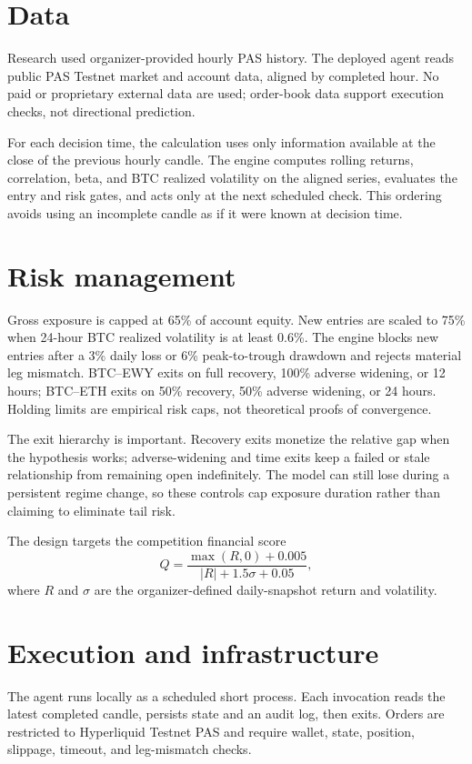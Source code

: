 \documentclass[a4paper,9pt]{article}
\begin{document}
\section{Data}
Research used organizer-provided hourly PAS history. The deployed agent reads
public PAS Testnet market and account data, aligned by completed hour. No paid
or proprietary external data are used; order-book data support execution checks,
not directional prediction.

For each decision time, the calculation uses only information available at the
close of the previous hourly candle. The engine computes rolling returns,
correlation, beta, and BTC realized volatility on the aligned series, evaluates
the entry and risk gates, and acts only at the next scheduled check. This
ordering avoids using an incomplete candle as if it were known at decision time.

\section{Risk management}
Gross exposure is capped at 65\% of account equity. New entries are scaled to
75\% when 24-hour BTC realized volatility is at least 0.6\%. The engine blocks
new entries after a 3\% daily loss or 6\% peak-to-trough drawdown and rejects
material leg mismatch.
BTC--EWY exits on full recovery, 100\% adverse widening, or 12 hours;
BTC--ETH exits on 50\% recovery, 50\% adverse widening, or 24 hours. Holding
limits are empirical risk caps, not theoretical proofs of convergence.

The exit hierarchy is important. Recovery exits monetize the relative gap when
the hypothesis works; adverse-widening and time exits keep a failed or stale
relationship from remaining open indefinitely. The model can still lose during
a persistent regime change, so these controls cap exposure duration rather than
claiming to eliminate tail risk.

The design targets the competition financial score
\[
Q=\frac{\max(R,0)+0.005}{|R|+1.5\sigma+0.05},
\]
where $R$ and $\sigma$ are the organizer-defined daily-snapshot return and
volatility.

\section{Execution and infrastructure}
The agent runs locally as a scheduled short process. Each invocation reads the
latest completed candle, persists state and an audit log, then exits. Orders are
restricted to Hyperliquid Testnet PAS and require wallet, state, position,
slippage, timeout, and leg-mismatch checks.
\end{document}
